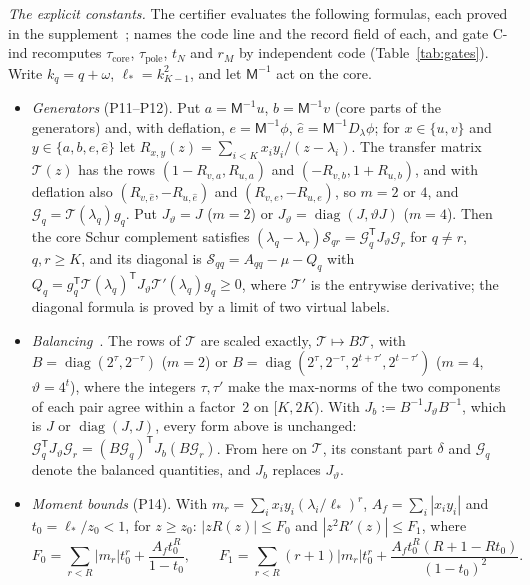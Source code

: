 \documentclass[11pt]{amsart}
\newcommand{\file}[1]{{\small\path{#1}}}
\newcommand{\Tp}{\mathsf T}
\theoremstyle{definition}
\theoremstyle{remark}
\numberwithin{equation}{section}
\begin{document}
\emph{The explicit constants.} The certifier evaluates the following formulas, each proved in the supplement~\cite{supp}; \file{supplement/MAP.md} names the code line and the record field of each, and gate C-ind recomputes $\tau_{\mathrm{core}}$, $\tau_{\mathrm{pole}}$, $t_N$ and $r_M$ by independent code (Table~\ref{tab:gates}). Write $k_q=q+\omega$, $\ell_*=k_{K-1}^2$, and let $\mathsf M^{-1}$ act on the core.
\begin{itemize}
\item \emph{Generators} (P11--P12). Put $a=\mathsf M^{-1}u$, $b=\mathsf M^{-1}v$ (core parts of the generators) and, with deflation, $e=\mathsf M^{-1}\phi$, $\hat e=\mathsf M^{-1}D_\lambda\phi$; for $x\in\{u,v\}$ and $y\in\{a,b,e,\hat e\}$ let $R_{x,y}(z)=\sum_{i<K}x_iy_i/(z-\lambda_i)$. The transfer matrix $\mathcal T(z)$ has the rows $(1-R_{v,a},R_{u,a})$ and $(-R_{v,b},1+R_{u,b})$, and with deflation also $(R_{v,\hat e},-R_{u,\hat e})$ and $(R_{v,e},-R_{u,e})$, so $m=2$ or $4$, and $\mathcal G_q=\mathcal T(\lambda_q)g_q$. Put $J_\vartheta=J$ ($m=2$) or $J_\vartheta=\operatorname{diag}(J,\vartheta J)$ ($m=4$). Then the core Schur complement satisfies $(\lambda_q-\lambda_r)\mathcal S_{qr}=\mathcal G_q^{\Tp}J_\vartheta\mathcal G_r$ for $q\ne r$, $q,r\ge K$, and its diagonal is $\mathcal S_{qq}=A_{qq}-\mu-Q_q$ with $Q_q=g_q^{\Tp}\mathcal T(\lambda_q)^{\Tp}J_\vartheta\mathcal T'(\lambda_q)g_q\ge0$, where $\mathcal T'$ is the entrywise derivative; the diagonal formula is proved by a limit of two virtual labels.
\item \emph{Balancing}~\cite[SPEC~T5, P15]{supp}. The rows of $\mathcal T$ are scaled exactly, $\mathcal T\mapsto B\mathcal T$, with $B=\operatorname{diag}(2^\tau,2^{-\tau})$ ($m=2$) or $B=\operatorname{diag}(2^\tau,2^{-\tau},2^{t+\tau'},2^{t-\tau'})$ ($m=4$, $\vartheta=4^t$), where the integers $\tau,\tau'$ make the max-norms of the two components of each pair agree within a factor~$2$ on $[K,2K)$. With $J_b:=B^{-1}J_\vartheta B^{-1}$, which is $J$ or $\operatorname{diag}(J,J)$, every form above is unchanged: $\mathcal G_q^{\Tp}J_\vartheta\mathcal G_r=(B\mathcal G_q)^{\Tp}J_b(B\mathcal G_r)$. From here on $\mathcal T$, its constant part $\delta$ and $\mathcal G_q$ denote the balanced quantities, and $J_b$ replaces $J_\vartheta$.
\item \emph{Moment bounds} (P14). With $m_r=\sum_ix_iy_i(\lambda_i/\ell_*)^r$, $A_f=\sum_i|x_iy_i|$ and $t_0=\ell_*/z_0<1$, for $z\ge z_0$: $|zR(z)|\le F_0$ and $|z^2R'(z)|\le F_1$, where
\[
F_0=\sum_{r<R}|m_r|t_0^r+\frac{A_ft_0^R}{1-t_0},\qquad F_1=\sum_{r<R}(r+1)|m_r|t_0^r+\frac{A_ft_0^R(R+1-Rt_0)}{(1-t_0)^2}.
\]
\end{itemize}
\end{document}
